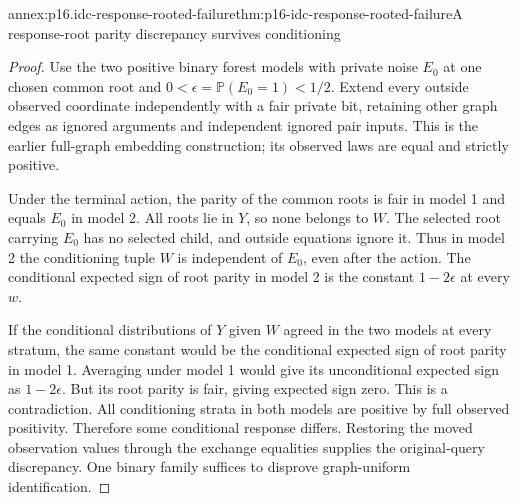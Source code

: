 \begin{annexitem}{annex:p16.idc-response-rooted-failure}{thm:p16-idc-response-rooted-failure}{A response-root parity discrepancy survives conditioning}
\begin{proof}
Use the two positive binary forest models with private noise
\(E_0\) at one chosen common root and
\(0<\epsilon=\mathbb P(E_0=1)<1/2\). Extend every outside
observed coordinate independently with a fair private bit, retaining
other graph edges as ignored arguments and independent ignored
pair inputs. This is the earlier full-graph embedding construction;
its observed laws are equal and strictly positive.

Under the terminal action, the parity of the common roots is
fair in model 1 and equals \(E_0\) in model 2. All roots
lie in \(Y\), so none belongs to \(W\). The selected
root carrying \(E_0\) has no selected child, and outside
equations ignore it. Thus in model 2 the conditioning tuple
\(W\) is independent of \(E_0\), even after the action.
The conditional expected sign of root parity in model 2 is
the constant \(1-2\epsilon\) at every \(w\).

If the conditional distributions of \(Y\) given \(W\)
agreed in the two models at every stratum, the same constant
would be the conditional expected sign of root parity in model 1.
Averaging under model 1 would give its unconditional expected
sign as \(1-2\epsilon\). But its root parity is fair, giving
expected sign zero. This is a contradiction. All conditioning
strata in both models are positive by full observed positivity.
Therefore some conditional response differs. Restoring the moved
observation values through the exchange equalities supplies the
original-query discrepancy. One binary family suffices to disprove
graph-uniform identification.
\end{proof}
\end{annexitem}

